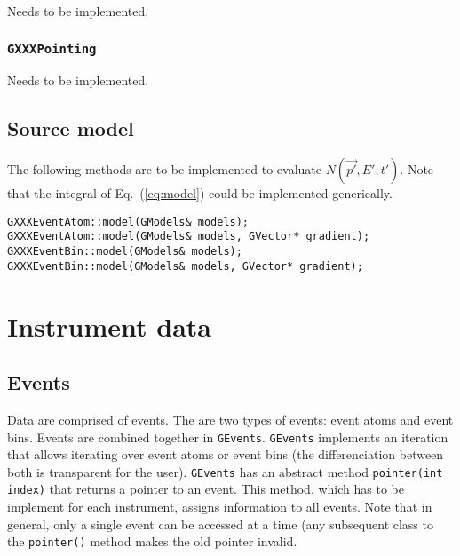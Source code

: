 \documentclass{article}[12pt,a4]
\begin{document}
Needs to be implemented.


\subsubsection{{\tt GXXXPointing}}

Needs to be implemented.


\subsection{Source model}

The following methods are to be implemented to evaluate $N(\vec{p'}, E', t')$.
Note that the integral of Eq.~(\ref{eq:model}) could be implemented
generically.

\begin{verbatim}
GXXXEventAtom::model(GModels& models);
GXXXEventAtom::model(GModels& models, GVector* gradient);
GXXXEventBin::model(GModels& models);
GXXXEventBin::model(GModels& models, GVector* gradient);
\end{verbatim}


\section{Instrument data}

\subsection{Events}

Data are comprised of events.
The are two types of events: event atoms and event bins.
Events are combined together in {\tt GEvents}.
{\tt GEvents} implements an iteration that allows iterating over event atoms or event bins
(the differenciation between both is transparent for the user).
{\tt GEvents} has an abstract method {\tt pointer(int index)} that returns a pointer to an
event.
This method, which has to be implement for each instrument, assigns information to
all events.
Note that in general, only a single event can be accessed at a time (any subsequent
class to the {\tt pointer()} method makes the old pointer invalid.
\end{document}
